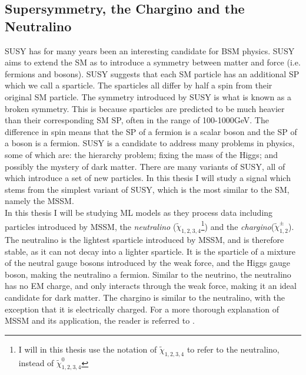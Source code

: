 \subsection{Supersymmetry, the Chargino and the Neutralino}\label{subsec:SS}
\acf{SUSY} has for many years been an interesting candidate for \ac{BSM} physics. 
\ac{SUSY} aims to extend the \ac{SM} as to introduce a symmetry between matter and force (i.e. fermions and bosons). 
\ac{SUSY} suggests that each \ac{SM} particle has an additional \ac{SP} which we call a sparticle. 
The sparticles all differ by half a spin from their original \ac{SM} particle. The symmetry introduced by \ac{SUSY} is what 
is known as a broken symmetry. This is because sparticles are predicted to be much heavier than their corresponding \ac{SM} \ac{SP}, 
often in the range of 100-1000GeV. The difference in spin means that the \ac{SP} of a fermion is a scalar boson and the \ac{SP} 
of a boson is a fermion. \ac{SUSY} is a candidate to address many problems in physics, some of which are: the hierarchy problem; fixing 
the mass of the Higgs; and possibly the mystery of dark matter. There are many variants of \ac{SUSY}, all of which introduce a set 
of new particles. In this thesis I will study a signal which stems from the simplest variant of \ac{SUSY}, which is the most 
similar to the \ac{SM}, namely the \ac{MSSM}. 
\\
In this thesis I will be studying \ac{ML} models as they process data including particles introduced by \ac{MSSM}, the \emph{neutralino} ($\tilde{\chi}_{1,2,3,4}$\footnote{I will in this thesis 
use the notation of $\tilde{\chi}_{1,2,3,4}$ to refer to the neutralino, instead of $\tilde{\chi}^0_{1,2,3,4}$}) and 
the \emph{chargino}($\tilde{\chi}^{\pm}_{1,2}$). The neutralino is the lightest sparticle introduced by \ac{MSSM}, and is therefore stable, as it can not decay into a lighter sparticle. 
It is the sparticle of a mixture of the neutral gauge bosons introduced by the weak force, and the Higgs gauge boson, making the neutralino a 
fermion. Similar to the neutrino, the neutralino has no \ac{EM} charge, and only interacts through the weak force, making it an ideal candidate 
for dark matter. The chargino is similar to the neutralino, with the exception that it is electrically charged. 
For a more thorough explanation of \ac{MSSM} and its application, the reader is referred to \cite{SUSY}. 